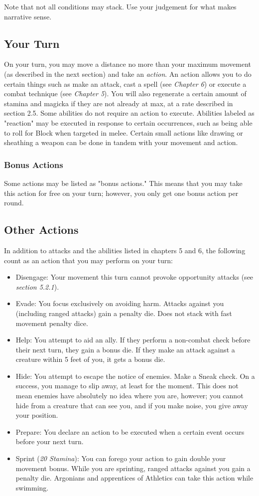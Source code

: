 Note that not all conditions may stack. Use your judgement for what makes narrative sense.

\subsection{Your Turn}
On your turn, you may move a distance no more than your maximum movement (as described in the next section) and take an \textit{action}. An action allows you to do certain things such as make an attack, cast a spell (see \textit{Chapter 6}) or execute a combat technique (see \textit{Chapter 5}). You will also regenerate a certain amount of stamina and magicka if they are not already at max, at a rate described in section 2.5. Some abilities do not require an action to execute. Abilities labeled as "reaction" may be executed in response to certain occurrences, such as being able to roll for Block when targeted in melee. Certain small actions like drawing or sheathing a weapon can be done in tandem with your movement and action.

\subsubsection{Bonus Actions}
Some actions may be listed as "bonus actions." This means that you may take this action for free on your turn; however, you only get one bonus action per round.

\subsection{Other Actions}
In addition to attacks and the abilities listed in chapters 5 and 6, the following count as an action that you may perform on your turn:

\begin{itemize}
	\item Disengage: Your movement this turn cannot provoke opportunity attacks (see \textit{section 5.2.1}).
	\item Evade: You focus exclusively on avoiding harm. Attacks against you (including ranged attacks) gain a penalty die. Does not stack with fast movement penalty dice.
	\item Help: You attempt to aid an ally. If they perform a non-combat check before their next turn, they gain a bonus die. If they make an attack against a creature within 5 feet of you, it gets a bonus die.
	\item Hide: You attempt to escape the notice of enemies. Make a Sneak check. On a success, you manage to slip away, at least for the moment. This does not mean enemies have absolutely no idea where you are, however; you cannot hide from a creature that can see you, and if you make noise, you give away your position.
	\item Prepare: You declare an action to be executed when a certain event occurs before your next turn.
	\item Sprint (\textit{20 Stamina}): You can forego your action to gain double your movement bonus. While you are sprinting, ranged attacks against you gain a penalty die. Argonians and apprentices of Athletics can take this action while swimming.
\end{itemize}

